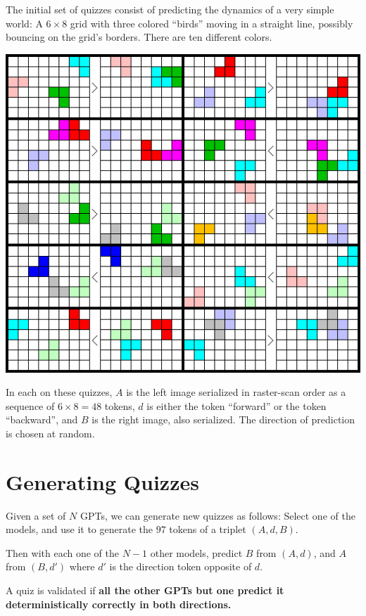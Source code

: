 \documentclass[11pt,a4paper,oneside]{article}
\begin{document}
The initial set of quizzes consist of predicting the dynamics of a
very simple world: A $6 \times 8$ grid with three colored ``birds'' moving in
a straight line, possibly bouncing on the grid's borders. There are
ten different colors.
%
\begin{center}
\includegraphics[scale=0.35]{pics/examples_train.png}
\end{center}
%

\vspace*{-2ex}

In each on these quizzes, $A$ is the left image serialized in
raster-scan order as a sequence of $6 \times 8 = 48$ tokens, $d$ is
either the token ``forward'' or the token ``backward'', and $B$ is the
right image, also serialized. The direction of prediction is chosen at
random.

\section{Generating Quizzes}

Given a set of $N$ GPTs, we can generate new quizzes as follows:
Select one of the models, and use it to generate the $97$ tokens of a
triplet $(A, d, B)$.

Then with each one of the $N-1$ other models, predict $B$ from $(A,
d)$, and $A$ from $(B, d')$ where $d'$ is the direction token opposite
of $d$.

A quiz is validated if \textbf{all the other GPTs but one predict it
  deterministically correctly in both directions.}
\end{document}
